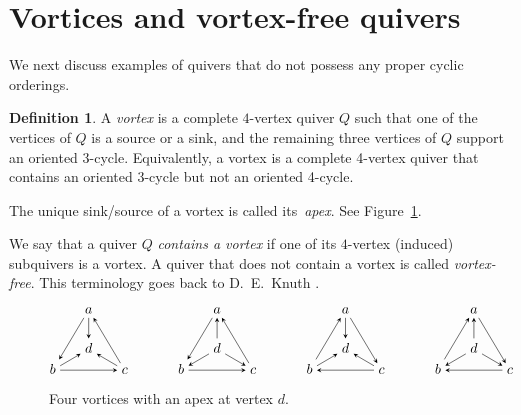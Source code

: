 \documentclass[11pt, letterpaper]{amsart}
\theoremstyle{definition}
\newtheorem{definition}[theorem]{Definition}
\numberwithin{equation}{section}
\begin{document}
\newpage

\section{Vortices and vortex-free quivers}

We next discuss examples of quivers that do not possess any proper cyclic orderings. 

\begin{definition}
\label{def:vortex}
A \emph{vortex} is a complete $4$-vertex quiver $Q$ such that
one of the vertices of $Q$ is a source or a sink, and 
the remaining three vertices of $Q$ support an oriented $3$-cycle. %
%
Equivalently, a vortex is a complete 4-vertex quiver that contains an oriented 3-cycle but not an oriented 4-cycle. 

The unique sink/source of a vortex is called its~\emph{apex}. 
See Figure~\ref{fig:vortices}. 

We say that a quiver $Q$ \emph{contains a vortex} if one of its $4$-vertex (induced) subquivers is a vortex. 
A quiver that does not contain a vortex is called \emph{vortex-free}.
This terminology goes back to D.~E.~Knuth \cite[Section~4]{Knuth}. 
\end{definition}


\begin{figure}[ht]
\begin{equation*}
\begin{tikzcd}[arrows={-stealth}, sep=15, cramped]
  & a \ar[d] \ar[ddl]  & \\ 
  & d & \\[-13pt]
  b  \ar[ur] \ar[rr]
  & & c \ar[ul] \ar[uul]
\end{tikzcd} 
\hspace{.5in} 
\begin{tikzcd}[arrows={-stealth}, sep=15, cramped]
  & a  \ar[ddl]  & \\ 
  & d \ar[u] \ar[dl] \ar[dr]& \\[-13pt]
  b   \ar[rr]
  & & c  \ar[uul]
\end{tikzcd}
\hspace{.5in} 
\begin{tikzcd}[arrows={-stealth}, sep=15, cramped]
  & a \ar[d] \ar[ddr]  & \\ 
  & d & \\[-13pt]
  b  \ar[ur] \ar[uur]
  & & c \ar[ul] \ar[ll]
\end{tikzcd} 
\hspace{.5in} 
\begin{tikzcd}[arrows={-stealth}, sep=15, cramped]
  & a  \ar[ddr]  & \\ 
  & d \ar[u] \ar[dl] \ar[dr]& \\[-13pt] 
  b   \ar[uur]
  & & c \ar[ll]
\end{tikzcd}
\end{equation*}
\vspace{2pt}
\caption{Four vortices with an apex at vertex $d$.}
\vspace{-7pt}
\label{fig:vortices}
\end{figure}
\end{document}
